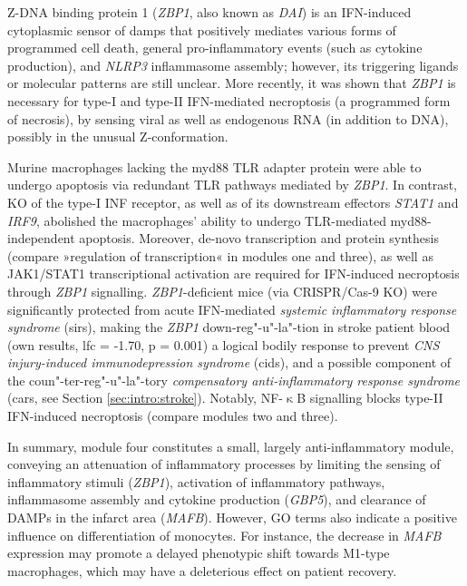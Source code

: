 Z-DNA binding protein 1 (\emph{ZBP1}, also known as \emph{DAI}) is an IFN-induced cytoplasmic sensor of \acp{damp} that positively mediates various forms of programmed cell death, general pro-inflammatory events (such as cytokine production), and \emph{NLRP3} inflammasome assembly; however, its triggering ligands or molecular patterns are still unclear.\cite{Kuriakose2018} More recently, it was shown that \emph{ZBP1} is necessary for type-I and type-II IFN-mediated necroptosis (a programmed form of necrosis),\cite{Yang2019} by sensing viral as well as endogenous RNA (in addition to DNA), possibly in the unusual Z-conformation.\cite{Maelfait2017} 

Murine macrophages lacking the \ac{myd88} TLR adapter protein were able to undergo apoptosis via redundant TLR pathways mediated by \emph{ZBP1}. In contrast, KO of the type-I INF receptor, as well as of its downstream effectors \emph{STAT1} and \emph{IRF9}, abolished the macrophages' ability to undergo TLR-mediated \ac{myd88}-independent apoptosis.\cite{Kuriakose2016} Moreover, de-novo transcription and protein synthesis (compare »regulation of transcription« in modules one and three), as well as JAK1/STAT1 transcriptional activation are required for IFN-induced necroptosis through \emph{ZBP1} signalling.\cite{Yang2019} \emph{ZBP1}-deficient mice (via CRISPR/Cas-9 KO) were significantly protected from acute IFN-mediated \emph{systemic inflammatory response syndrome} (\acs{sirs}),\cite{Yang2019} making the \emph{ZBP1} down-reg"-u"-la"-tion in stroke patient blood (own results, \ac{lfc} = -1.70, p = 0.001) a logical bodily response to prevent \emph{CNS injury-induced immunodepression syndrome} (\acs{cids}), and a possible component of the coun"-ter-reg"-u"-la"-tory \emph{compensatory anti-inflammatory response syndrome} (\acs{cars}, see Section \ref{sec:intro:stroke}). Notably, NF-$\upkappa$B signalling blocks type-II IFN-induced necroptosis (compare modules two and three).\cite{Thapa2011}


In summary, module four constitutes a small, largely anti-inflammatory module, conveying an attenuation of inflammatory processes by limiting the sensing of inflammatory stimuli (\emph{ZBP1}), activation of inflammatory pathways, inflammasome assembly and cytokine production (\emph{GBP5}), and clearance of DAMPs in the infarct area (\emph{MAFB}). However, GO terms also indicate a positive influence on differentiation of monocytes. For instance, the decrease in \emph{MAFB} expression may promote a delayed phenotypic shift towards M1-type macrophages, which may have a deleterious effect on patient recovery.


